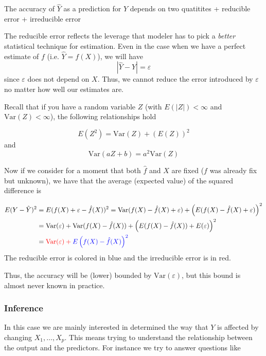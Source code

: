 \documentclass[11pt]{article}
\begin{document}
The accuracy of \(\hat{Y}\) as a prediction for \(Y\) depends on two
quatitites + reducible error + irreducible error

The reducible error reflects the leverage that modeler has to pick a
\emph{better} statistical technique for estimation. Even in the case
when we have a perfect estimate of \(f\) (i.e. \(\hat{Y}=f(X)\)), we
will have \begin{equation*}
|\hat{Y}-Y| = \varepsilon
\end{equation*} since \(\varepsilon\) does not depend on \(X\). Thus, we
cannot reduce the error introduced by \(\varepsilon\) no matter how well
our estimates are.

Recall that if you have a random variable \(Z\) (with \(E(|Z|)<\infty\)
and \(\mathrm{Var}(Z)<\infty\)), the following relationships hold

\[E(Z^2)= \mathrm{Var}(Z) + (E(Z))^2\] and
\[\mathrm{Var}(aZ+b)= a^2\mathrm{Var}(Z)\]

Now if we consider for a moment that both \(\hat{f}\) and \(X\) are
fixed (\(f\) was already fix but unknown), we have that the average
(expected value) of the squared difference is

\begin{equation}
\begin{split}
E(Y-\hat{Y})^2&= E(f(X)+ \varepsilon -\hat{f}(X))^2= \mathrm{Var}(f(X)-\hat{f}(X)+ \varepsilon ) + \left(E(f(X)-\hat{f}(X)+\varepsilon) \right)^2 \\
&= \mathrm{Var}(\varepsilon) + \mathrm{Var}(f(X)-\hat{f}(X))+ \left( E(f(X)-\hat{f}(X)) + E(\varepsilon) \right)^2\\
&= \color{red}{\mathrm{Var}(\varepsilon)}+\color{blue}{E\left( f(X)-\hat{f}(X)\right)^2} 
\end{split}
\end{equation} The reducible error is colored in blue and the
irreducible error is in red.

Thus, the accuracy will be (lower) bounded by
\(\mathrm{Var}(\varepsilon)\), but this bound is almost never known in
practice.

    \hypertarget{inference}{%
\subsubsection{Inference}\label{inference}}

In this case we are mainly interested in determined the way that \(Y\)
is affected by changing \(X_1,\ldots,X_p\). This means trying to
understand the relationship between the output and the predictors. For
instance we try to answer questions like
\end{document}
